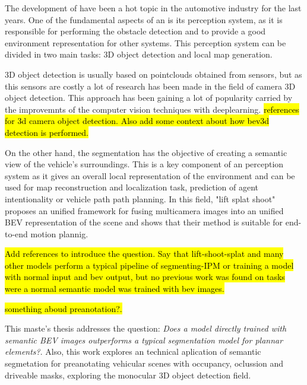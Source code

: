 
The development of  have been a hot topic in the automotive industry for the last years. One of the fundamental aspects of an  is its perception system, as it is responsible for performing the obstacle detection and to provide a good environment representation for other systems. This perception system can be divided in two main tasks: 3D object detection and local  map generation. 

3D object detection is usually based on pointclouds obtained from  sensors, but as this sensors are costly a lot of research has been made in the field of camera 3D object detection. This approach has been gaining a lot of popularity carried by the improvemnts of the computer vision techniques with deeplearning. \hl{references for 3d camera object detection. Also add some context about how bev3d detection is performed.}

On the other hand, the  segmentation has the objective of creating a semantic view of the vehicle's surroundings. This is a key component of an  perception system as it gives an overall local representation of the environment and can be used for map reconstruction and localization task, prediction of agent intentionality or vehicle path path planning. In this field, "lift splat shoot" \cite{dummy} proposes an unified framework for fusing multicamera images into an unified \acl{BEV} representation of the scene and shows that their method is suitable for end-to-end motion plannig.

\hl{Add references to introduce the question. Say that lift-shoot-splat and many other models perform a typical pipeline of segmenting-IPM or training a model with normal input and bev output, but no previous work was found on tasks were a normal semantic model was trained with bev images.}

\hl{something aboud preanotation?.}

This maste's thesis addresses the question: \textit{Does a model directly trained with semantic BEV images outperforms a typical segmentation model for plannar elements?}. Also, this work explores an technical aplication of semantic  segmetation for preanotating vehicular scenes with occupancy, oclussion and driveable masks, exploring the monocular 3D object detection field.


